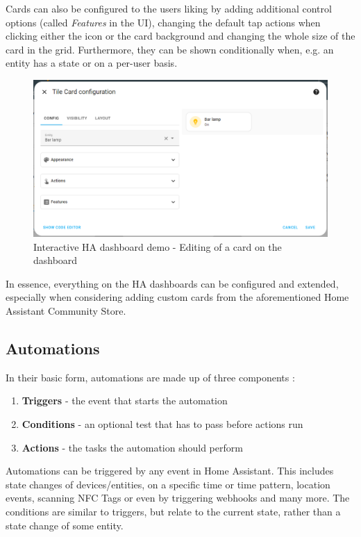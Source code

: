 Cards can also be configured to the users liking by adding additional control options (called \textit{Features} in the UI), changing the default tap actions when clicking either the icon or the card background and changing the whole size of the card in the grid. Furthermore, they can be shown conditionally when, e.g. an entity has a state or on a per-user basis.

\begin{figure}[H]
    \centering
    \includegraphics[width=.95\linewidth]{img/ha-dashboard-demo-editing-card.png}
    \caption{Interactive HA dashboard demo - Editing of a card on the dashboard \cite{HomeAssistant_Dashboard_Demo}}
    \label{fig:HA-Dashboard-Demo-Editing-Card}
\end{figure}

In essence, everything on the HA dashboards can be configured and extended, especially when considering adding custom cards from the aforementioned Home Assistant Community Store.

\subsection{Automations}
\label{sec:ha-automations}

In their basic form, automations are made up of three components \cite{HomeAssistant_Docs_Services}:

\begin{enumerate}
    \item \textbf{Triggers} - the event that starts the automation
    \item \textbf{Conditions} - an optional test that has to pass before actions run
    \item \textbf{Actions} - the tasks the automation should perform
\end{enumerate}

Automations can be triggered by any event in Home Assistant. This includes state changes of devices/entities, on a specific time or time pattern, location events, scanning NFC Tags or even by triggering webhooks and many more. The conditions are similar to triggers, but relate to the current state, rather than a state change of some entity.

